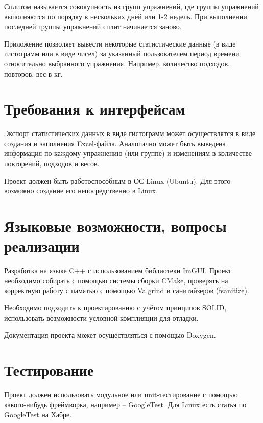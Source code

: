 	Сплитом называется совокупность из групп упражнений, где группы упражнений выполняются по порядку в нескольких дней или 1-2 недель. При выполнении последней группы упражнений сплит начинается заново.
	
	Приложение позволяет вывести некоторые статистические данные (в виде гистограмм или в виде чисел) за указанный пользователем период времени относительно выбранного упражнения. Например, количество подходов, повторов, вес в кг.
	
	\section{Требования к интерфейсам}
	Экспорт статистических данных в виде гистограмм может осуществлятся в виде создания и заполнения Excel-файла. Аналогично может быть выведена информация по каждому упражнению (или группе) и изменениям в количестве повторений, подходов и весов.
	
	Проект должен быть работоспособным в ОС Linux (Ubuntu). Для этого возможно создание его непосредственно в Linux.
	
	\section{Языковые возможности, вопросы реализации}
	Разработка на языке C++ с использованием библиотеки \href{https://www.youtube.com/watch?v=vWXrFetSH8w}{ImGUI}. Проект необходимо собирать с помощью системы сборки CMake, проверять на корректную работу с памятью с помощью Valgrind и санитайзеров (\href{https://youtu.be/HJilO9FUWns?si=vk1jWReRwn7364g2}{fsanitize}). 
	
	Необходимо подходить к проектированию с учётом принципов SOLID, использовать возможности условной комплияции для отладки.
	
	Документация проекта может осуществляться с помощью Doxygen.
	
	\section{Тестирование}
	Проект должен использовать модульное или unit-тестирование с помощью какого-нибудь фреймворка, например -- \href{https://www.youtube.com/playlist?list=PL5jc9xFGsL8GyES7nh-1yqljjdTvIFSsh}{GoogleTest}. Для Linux есть статья по GoogleTest на \href{https://habr.com/ru/articles/667880/}{Хабре}.
	

